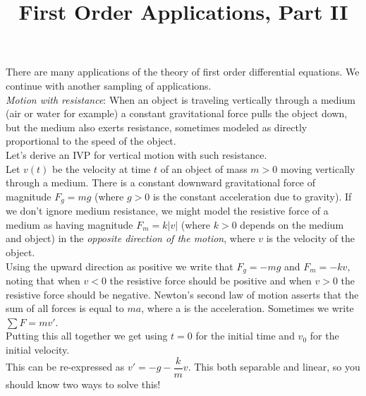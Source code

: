 \documentclass{ximera}
\begin{document}
\begin{abstract}
 \end{abstract}

    \title{First Order Applications, Part II}
    
    \maketitle


 There are many applications of the theory of first order differential equations.  We continue with another sampling of applications.\\


 \emph{Motion with resistance}:   When an object is traveling vertically through a medium (air or water for example) a constant gravitational force pulls the object down, but the medium also exerts resistance, sometimes modeled as directly proportional to the speed of the object.\\

 Let's derive an IVP for vertical motion with such resistance.  \\

 Let $v(t)$ be the velocity at time $t$ of an object of mass $m>0$ moving vertically through a medium.  There is a constant downward gravitational force of magnitude $F_{g}=mg$ (where $g>0$ is the constant acceleration due to gravity).  If we don't ignore medium resistance, we might model the resistive force of a medium as having magnitude $F_{m}=k|v|$ (where $k>0$ depends on the medium and object) in the \emph{opposite direction of the motion}, where $v$ is the velocity of the object.\\

 Using the upward direction as positive we write that $F_g=-mg$ and $F_m=-kv$, noting that when $v<0$ the resistive force should be positive and when $v>0$ the resistive force should be negative.  Newton's second law of motion asserts that the sum of all forces is equal to $ma$, where a is the acceleration.  Sometimes we write $\displaystyle \sum F=mv'$.\\

 Putting this all together we get  using $t=0$ for the initial time and $v_0$ for the initial velocity.\\

 This can be re-expressed as $v'=-g-\dfrac{k}{m}v$.  This both separable and linear, so you should know two ways to solve this!\\
\end{document}
